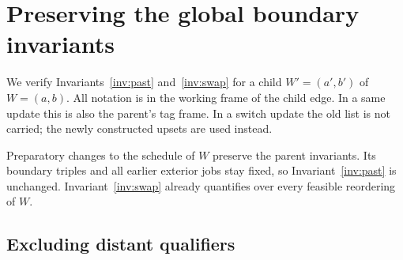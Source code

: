 \section{Preserving the global boundary invariants}\label{sec:boundary}

We verify Invariants~\ref{inv:past} and~\ref{inv:swap}
for a child \(W'=(a',b')\) of \(W=(a,b)\).
All notation is in the working frame of the child edge.
In a same update this is also the parent's tag frame.
In a switch update the old list is not carried; the newly constructed
upsets are used instead.

Preparatory changes to the schedule of \(W\) preserve the parent
invariants. Its boundary triples and all earlier exterior jobs
stay fixed, so Invariant~\ref{inv:past} is unchanged.
Invariant~\ref{inv:swap} already quantifies over every feasible
reordering of \(W\).

\subsection{Excluding distant qualifiers}

